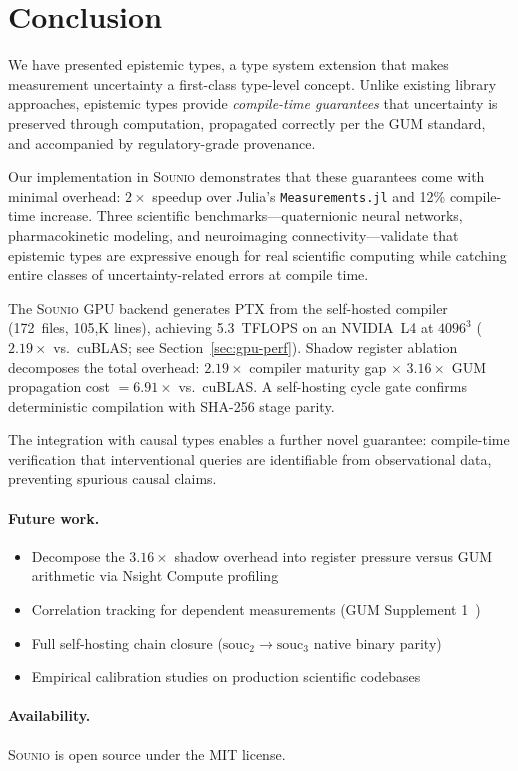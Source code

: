 \documentclass[acmsmall,screen,review,anonymous]{acmart}
\newcommand{\sounio}{\textsc{Sounio}\xspace}
\begin{document}
\section{Conclusion}
\label{sec:conclusion}

We have presented epistemic types, a type system extension that makes
measurement uncertainty a first-class type-level concept.
Unlike existing library approaches, epistemic types provide
\emph{compile-time guarantees} that uncertainty is preserved through
computation, propagated correctly per the GUM standard, and
accompanied by regulatory-grade provenance.

Our implementation in \sounio demonstrates that these guarantees come
with minimal overhead: $2\times$ speedup over Julia's
\texttt{Measurements.jl} and 12\% compile-time increase.
Three scientific benchmarks---quaternionic neural networks,
pharmacokinetic modeling, and neuroimaging connectivity---validate
that epistemic types are expressive enough for real scientific
computing while catching entire classes of uncertainty-related errors
at compile time.

The \sounio GPU backend generates PTX from the self-hosted compiler
(172~files, 105{,}K lines), achieving 5.3~TFLOPS on an NVIDIA~L4 at
$4096^3$ ($2.19\times$ vs.\ cuBLAS; see Section~\ref{sec:gpu-perf}).
Shadow register ablation decomposes the total overhead: $2.19\times$
compiler maturity gap $\times$ $3.16\times$ GUM propagation cost $=
6.91\times$ vs.\ cuBLAS.
A self-hosting cycle gate confirms deterministic compilation with
SHA-256 stage parity.

The integration with causal types enables a further novel guarantee:
compile-time verification that interventional queries are identifiable
from observational data, preventing spurious causal claims.

\paragraph{Future work.}
\begin{itemize}
  \item Decompose the $3.16\times$ shadow overhead into register
        pressure versus GUM arithmetic via Nsight Compute profiling
  \item Correlation tracking for dependent measurements
        (GUM Supplement 1~\cite{jcgm2008supplement1})
  \item Full self-hosting chain closure ($\text{souc}_2 \to \text{souc}_3$
        native binary parity)
  \item Empirical calibration studies on production scientific codebases
\end{itemize}

\paragraph{Availability.}
\sounio is open source under the MIT license.



\end{document}

